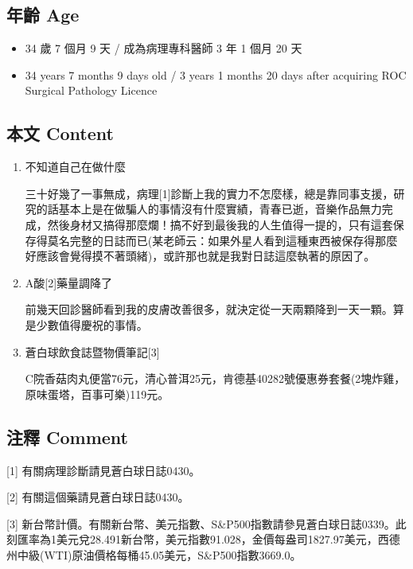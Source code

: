 \documentclass[a5paper, 10pt
]{book}
\providecommand{\tightlist}{%
  \setlength{\itemsep}{0pt}\setlength{\parskip}{0pt}}
\begin{document}
\hypertarget{ux5e74ux9f61-age-1}{%
\subsection{年齡 Age}\label{ux5e74ux9f61-age-1}}

\begin{itemize}
\tightlist
\item
  34 歲 7 個月 9 天 / 成為病理專科醫師 3 年 1 個月 20 天
\item
  34 years 7 months 9 days old / 3 years 1 months 20 days after
  acquiring ROC Surgical Pathology Licence
\end{itemize}

\hypertarget{ux672cux6587-content-1}{%
\subsection{本文 Content}\label{ux672cux6587-content-1}}

\begin{enumerate}
\def\labelenumi{\arabic{enumi}.}
\item
  不知道自己在做什麼

  三十好幾了一事無成，病理{[}1{]}診斷上我的實力不怎麼樣，總是靠同事支援，研究的話基本上是在做騙人的事情沒有什麼實績，青春已逝，音樂作品無力完成，然後身材又搞得那麼爛！搞不好到最後我的人生值得一提的，只有這套保存得莫名完整的日誌而已(某老師云：如果外星人看到這種東西被保存得那麼好應該會覺得摸不著頭緒)，或許那也就是我對日誌這麼執著的原因了。
\item
  A酸{[}2{]}藥量調降了

  前幾天回診醫師看到我的皮膚改善很多，就決定從一天兩顆降到一天一顆。算是少數值得慶祝的事情。
\item
  蒼白球飲食誌暨物價筆記{[}3{]}

  C院香菇肉丸便當76元，清心普洱25元，肯德基40282號優惠券套餐(2塊炸雞，原味蛋塔，百事可樂)119元。
\end{enumerate}

\hypertarget{ux6ce8ux91cb-comment-1}{%
\subsection{注釋 Comment}\label{ux6ce8ux91cb-comment-1}}

{[}1{]} 有關病理診斷請見蒼白球日誌0430。

{[}2{]} 有關這個藥請見蒼白球日誌0430。

{[}3{]}
新台幣計價。有關新台幣、美元指數、S\&P500指數請參見蒼白球日誌0339。此刻匯率為1美元兌28.491新台幣，美元指數91.028，金價每盎司1827.97美元，西德州中級(WTI)原油價格每桶45.05美元，S\&P500指數3669.0。
\end{document}
